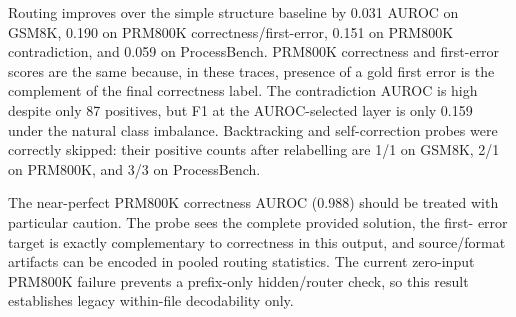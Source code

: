 \documentclass[manuscript,screen,review]{jair}
\newcommand{\modelmetrics}[2]{\textit{Model(s):} #1. \textit{Metrics:} #2.}
\begin{document}
\begin{table}[t]
\centering
\caption{Legacy best-layer full-trace router probes. The selected-layer
comparison is exploratory and is not corrected for selecting the best of 16
layers.  \modelmetrics{\texttt{allenai/OLMoE-1B-7B-0924-Instruct}, with
five-fold trace-level logistic probes; PRM800K is legacy}{trace and positive
counts, selected layer, out-of-fold router-feature AUROC with trace-bootstrap
95\% confidence interval, balanced accuracy, and structure-baseline AUROC}}
\label{tab:router-probes}
\end{table}

Routing improves over the simple structure baseline by 0.031 AUROC on GSM8K,
0.190 on PRM800K correctness/first-error, 0.151 on PRM800K contradiction, and
0.059 on ProcessBench.  PRM800K correctness and first-error scores are the same
because, in these traces, presence of a gold first error is the complement of
the final correctness label.  The contradiction AUROC is high despite only 87
positives, but F1 at the AUROC-selected layer is only 0.159 under the natural
class imbalance.  Backtracking and self-correction probes were correctly
skipped: their positive counts after relabelling are 1/1 on GSM8K, 2/1 on
PRM800K, and 3/3 on ProcessBench.

The near-perfect PRM800K correctness AUROC (0.988) should be treated with
particular caution.  The probe sees the complete provided solution, the first-
error target is exactly complementary to correctness in this output, and
source/format artifacts can be encoded in pooled routing statistics.  The
current zero-input PRM800K failure prevents a prefix-only hidden/router check,
so this result establishes legacy within-file decodability only.
\end{document}
